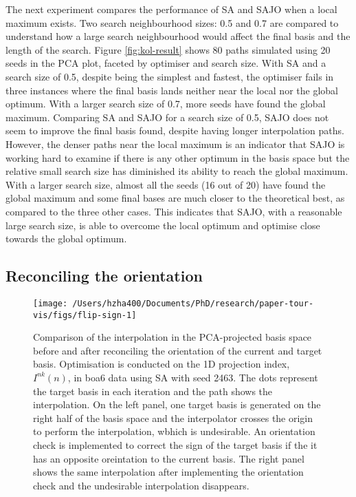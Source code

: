 The next experiment compares the performance of SA and SAJO when a local
maximum exists. Two search neighbourhood sizes: 0.5 and 0.7 are compared
to understand how a large search neighbourhood would affect the final
basis and the length of the search. Figure \ref{fig:kol-result} shows 80
paths simulated using 20 seeds in the PCA plot, faceted by optimiser and
search size. With SA and a search size of 0.5, despite being the
simplest and fastest, the optimiser fails in three instances where the
final basis lands neither near the local nor the global optimum. With a
larger search size of 0.7, more seeds have found the global maximum.
Comparing SA and SAJO for a search size of 0.5, SAJO does not seem to
improve the final basis found, despite having longer interpolation
paths. However, the denser paths near the local maximum is an indicator
that SAJO is working hard to examine if there is any other optimum in
the basis space but the relative small search size has diminished its
ability to reach the global maximum. With a larger search size, almost
all the seeds (16 out of 20) have found the global maximum and some
final bases are much closer to the theoretical best, as compared to the
three other cases. This indicates that SAJO, with a reasonable large
search size, is able to overcome the local optimum and optimise close
towards the global optimum.

\hypertarget{reconciling-the-orientation}{%
\subsection{Reconciling the
orientation}\label{reconciling-the-orientation}}

\begin{Schunk}
\begin{figure}

{\centering \texttt{[image: /Users/hzha400/Documents/PhD/research/paper-tour-vis/figs/flip-sign-1]} 

}

\caption[Comparison of the interpolation in the PCA-projected basis space before and after reconciling the orientation of the current and target basis]{Comparison of the interpolation in the PCA-projected basis space before and after reconciling the orientation of the current and target basis. Optimisation is conducted on the 1D projection index, $I^{nk}(n)$, in boa6 data using SA with seed 2463. The dots represent the target basis in each iteration and the path shows the interpolation. On the left panel, one target basis is generated on the right half of the basis space and the interpolator crosses the origin to perform the interpolation, wbhich is undesirable. An orientation check is implemented to correct the sign of the target basis if the it has an opposite oreintation to the current basis. The right panel shows the same interpolation after implementing the orientation check and the undesirable interpolation disappears.}\label{fig:flip-sign}
\end{figure}
\end{Schunk}

